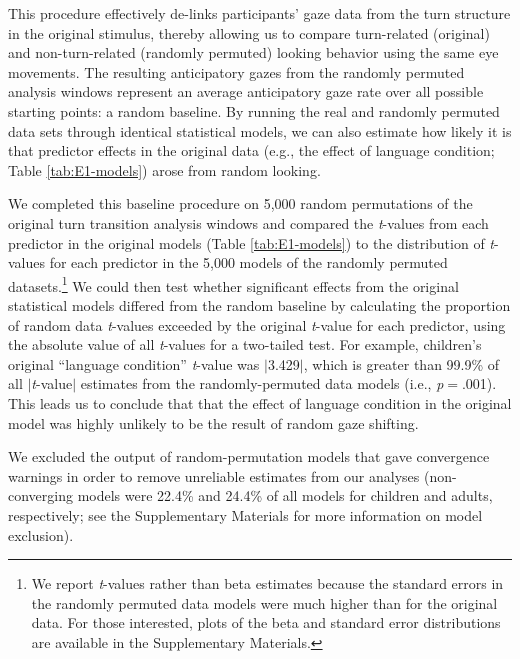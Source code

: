 \documentclass[authoryear, 12pt]{elsarticle}
\begin{document}
This procedure effectively de-links participants' gaze data from the turn structure in the original stimulus, thereby allowing us to compare turn-related (original) and non-turn-related (randomly permuted) looking behavior using the same eye movements. The resulting anticipatory gazes from the randomly permuted analysis windows represent an average anticipatory gaze rate over all possible starting points: a random baseline. By running the real and randomly permuted data sets through identical statistical models, we can also estimate how likely it is that predictor effects in the original data (e.g., the effect of language condition; Table \ref{tab:E1-models}) arose from random looking.

We completed this baseline procedure on 5,000 random permutations of the original turn transition analysis windows and compared the \textit{t}-values from each predictor in the original models (Table \ref{tab:E1-models}) to the distribution of \textit{t}-values for each predictor in the 5,000 models of the randomly permuted datasets.\footnote{We report \textit{t}-values rather than beta estimates because the standard errors in the randomly permuted data models were much higher than for the original data. For those interested, plots of the beta and standard error distributions are available in the Supplementary Materials.} We could then test whether significant effects from the original statistical models differed from the random baseline by calculating the proportion of random data \textit{t}-values exceeded by the original \textit{t}-value for each predictor, using the absolute value of all \textit{t}-values for a two-tailed test. For example, children's original ``language condition'' \textit{t}-value was $|$3.429$|$, which is greater than 99.9\% of all $|$\textit{t}-value$|$ estimates from the randomly-permuted data models (i.e., \textit{p}$=$.001). This leads us to conclude that that the effect of language condition in the original model was highly unlikely to be the result of random gaze shifting. 

We excluded the output of random-permutation models that gave convergence warnings in order to remove unreliable estimates from our analyses (non-converging models were 22.4\% and 24.4\% of all models for children and adults, respectively; see the Supplementary Materials for more information on model exclusion).
\end{document}
